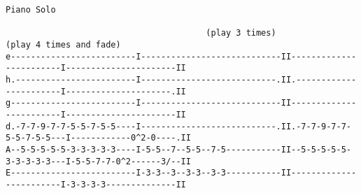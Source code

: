 \begin{verbatim}
Piano Solo

                                        (play 3 times)                          (play 4 times and fade)
e-------------------------I----------------------------II------------------------I----------------------II
h.------------------------I---------------------------.II.-----------------------I---------------------.II
g-------------------------I----------------------------II------------------------I----------------------II
d.-7-7-9-7-7-5-5-7-5-5----I---------------------------.II.-7-7-9-7-7-5-5-7-5-5---I------------0^2-0----.II
A--5-5-5-5-5-3-3-3-3-3----I-5-5--7--5-5--7-5-----------II--5-5-5-5-5-3-3-3-3-3---I-5-5-7-7-0^2------3/--II
E-------------------------I-3-3--3--3-3--3-3-----------II------------------------I-3-3-3-3--------------II
\end{verbatim}
\newpage


